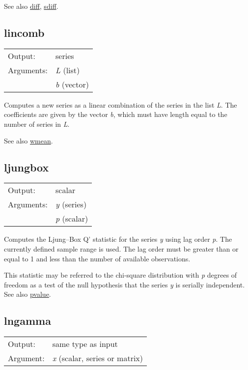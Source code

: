 	  See also \hyperlink{func-diff}{diff}, \hyperlink{func-sdiff}{sdiff}.

\subsection{lincomb}
\hypertarget{func-lincomb}{}

\begin{tabular}{ll}
Output:     & series\\
Arguments:  & \textsl{L} (list)\\
           & \textsl{b} (vector)\\
\end{tabular}

	  Computes a new series as a linear combination of the series in the
	  list \textsl{L}.  The coefficients are given by the vector
	  \textsl{b}, which must have length equal to the number of
	  series in \textsl{L}.

	  See also \hyperlink{func-wmean}{wmean}.

\subsection{ljungbox}
\hypertarget{func-ljungbox}{}

\begin{tabular}{ll}
Output:     & scalar\\
Arguments:  & \textsl{y} (series)\\
           & \textsl{p} (scalar)\\
\end{tabular}

	  Computes the Ljung--Box Q' statistic for the series
	  \textsl{y} using lag order \textsl{p}. The
	  currently defined sample range is used.  The lag order must be
	  greater than or equal to 1 and less than the number of available
	  observations.  

	  This statistic may be referred to the chi-square distribution with
	  \textsl{p} degrees of freedom as a test of the null
	  hypothesis that the series \textsl{y} is serially
	  independent.
	  See also \hyperlink{func-pvalue}{pvalue}.

\subsection{lngamma}
\hypertarget{func-lngamma}{}

\begin{tabular}{ll}
Output:     & same type as input\\
Argument:   & \textsl{x} (scalar, series or matrix)\\
\end{tabular}

